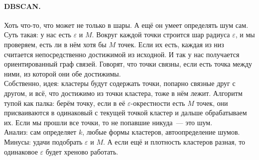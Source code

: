 \documentclass{article}
\begin{document}
    \paragraph{DBSCAN.}
    Хоть что-то, что может не только в шары. А ещё он умеет определять шум сам.\\
    Суть такая: у нас есть $\varepsilon$ и $M$. Вокруг каждой точки строится шар радиуса $\varepsilon$, и мы проверяем, есть ли в нём хотя бы $M$ точек. Если их есть, каждая из низ считается непосредственно достижимой из исходной. И так у нас получается ориентированный граф связей. Говорят, что точки связны, если есть точка между ними, из которой они обе достижимы.\\
    Собственно, идея: кластеры будут содержать точки, попарно связные друг с другом, и всё, что достижимо из точки кластера, тоже в нём лежит. Алгоритм тупой как палка: берём точку, если в её $\varepsilon$-окрестности есть $M$ точек, они присваиваются в одинаковый с текущей точкой кластер и дальше обрабатываем их. Если мы прошли все точки, то не попавшие никуда~--- это шум.\\
    Анализ: сам определяет $k$, любые формы кластеров, автоопределение шумов. Минусы: удачи подобрать $\varepsilon$ и $M$. А если ещё и плотность кластеров разная, то одинаковое $\varepsilon$ будет хреново работать.
\end{document}
